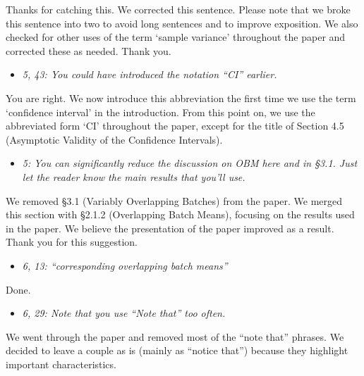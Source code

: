 \documentclass[11pt,notitlepage,onecolumn]{article}
\newcommand{\noi}{\noindent}
\begin{document}
\noi
Thanks for catching this. 
We corrected this sentence. 
Please note that we broke this sentence into two to avoid long sentences and to improve exposition. 
We also checked for other uses of the term `sample variance' throughout the paper and corrected these as needed.
Thank you.  
\medskip 


\begin{itemize}
\item[] \textit{5, 43: You could have introduced the notation ``CI'' earlier.}
\end{itemize}

\noi
You are right. 
We now introduce this abbreviation the first time we use the term `confidence interval' in the introduction. 
From this point on, we use the abbreviated form `CI' throughout the paper, except for the title of Section 4.5 (Asymptotic Validity of the Confidence Intervals). 
\medskip 



\begin{itemize}
\item[] \textit{5: You can significantly reduce the discussion on OBM here and in \S 3.1. 
Just let the reader know the main results that you'll use.}
\end{itemize}

\noi
We removed \S 3.1 (Variably Overlapping Batches) from the paper. 
We merged this section with \S 2.1.2 (Overlapping Batch Means), focusing on the results used in the paper. 
We believe the presentation of the paper improved as a result. 
Thank you for this suggestion. 
\medskip 



\begin{itemize}
\item[] \textit{6, 13: ``corresponding overlapping batch means''}
\end{itemize}

\noi
Done. 
\medskip 



\begin{itemize}
\item[] \textit{6, 29: Note that you use ``Note that'' too often.}
\end{itemize}

\noi
We went through the paper and removed most of the ``note that'' phrases. 
We decided to leave a couple as is (mainly as ``notice that'') because they highlight important characteristics.  
\medskip 
\end{document}
